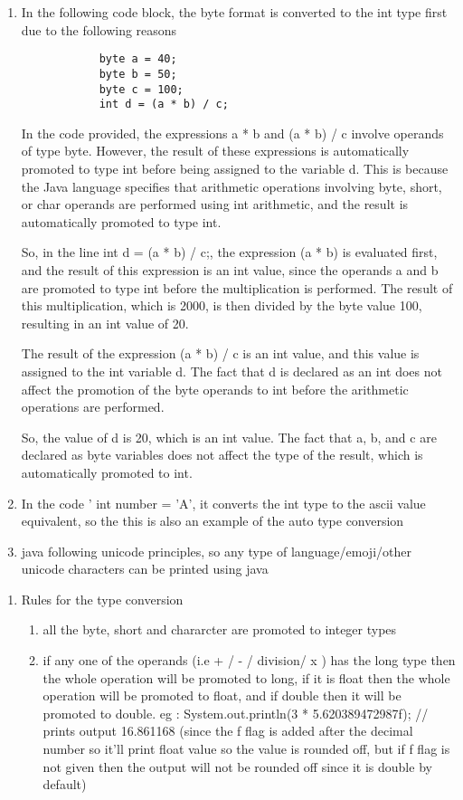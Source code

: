 \documentclass[11pt]{article}
\begin{document}
\begin{enumerate}
\begin{enumerate}
\begin{itemize}
\end{itemize}
\item In the following code block, the byte format is converted to the int type first due to the following reasons
\begin{verbatim}
            byte a = 40;
            byte b = 50;
            byte c = 100;
            int d = (a * b) / c;
\end{verbatim}
In the code provided, the expressions a * b and (a * b) / c involve operands of type byte. However, the result of these expressions is automatically promoted to type int before being assigned to the variable d. This is because the Java language specifies that arithmetic operations involving byte, short, or char operands are performed using int arithmetic, and the result is automatically promoted to type int.

So, in the line int d = (a * b) / c;, the expression (a * b) is evaluated first, and the result of this expression is an int value, since the operands a and b are promoted to type int before the multiplication is performed. The result of this multiplication, which is 2000, is then divided by the byte value 100, resulting in an int value of 20.

The result of the expression (a * b) / c is an int value, and this value is assigned to the int variable d. The fact that d is declared as an int does not affect the promotion of the byte operands to int before the arithmetic operations are performed.

So, the value of d is 20, which is an int value. The fact that a, b, and c are declared as byte variables does not affect the type of the result, which is automatically promoted to int.
\item In the code ' int number = 'A', it converts the int type to the ascii value equivalent, so the this is also an example of the auto type conversion
\item java following unicode principles, so any type of language/emoji/other unicode characters can be printed using java
\end{enumerate}
\end{enumerate}

\begin{enumerate}
\item Rules for the type conversion
\label{sec:orgc0b234c}
\begin{enumerate}
\item all the byte, short and chararcter are promoted to integer types
\item if any one of the operands (i.e + / - / division/ x ) has the long type then the whole operation will be promoted to long, if it is float then the whole operation will be promoted to float, and if double then it will be promoted to double.
eg : System.out.println(3 * 5.620389472987f); // prints output 16.861168 (since the f flag is added after the decimal number so it'll print float value so the value is rounded off, but if f flag is not given then the output will not be rounded off since it is double by default)
\end{enumerate}
\end{enumerate}
\end{document}
